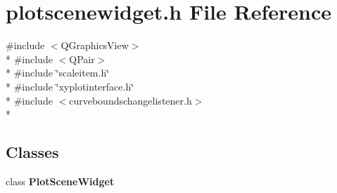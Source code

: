 \section{plotscenewidget.\+h File Reference}
\label{bk3_2plotscenewidget_8h}
{\ttfamily \#include $<$Q\+Graphics\+View$>$}\\*
{\ttfamily \#include $<$Q\+Pair$>$}\\*
{\ttfamily \#include \char`\"{}scaleitem.\+h\char`\"{}}\\*
{\ttfamily \#include \char`\"{}xyplotinterface.\+h\char`\"{}}\\*
{\ttfamily \#include $<$curveboundschangelistener.\+h$>$}\\*
\subsection*{Classes}
\begin{DoxyCompactItemize}
\item 
class {\bf Plot\+Scene\+Widget}
\end{DoxyCompactItemize}
